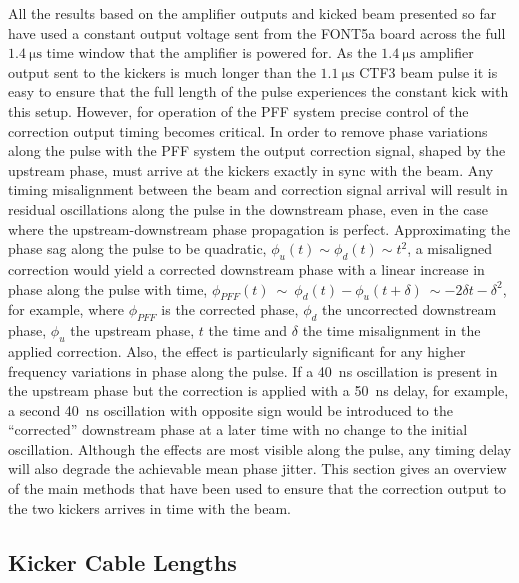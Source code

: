 
All the results based on the amplifier outputs and kicked beam presented so far have used a constant output voltage sent from the FONT5a board across the full \(1.4~\mathrm{\mu s}\) time window that the amplifier is powered for. As the \(1.4~\mathrm{\mu s}\) amplifier output sent to the kickers is much longer than the \(1.1~\mathrm{\mu s}\) CTF3 beam pulse it is easy to ensure that the full length of the pulse experiences the constant kick with this setup. However, for operation of the PFF system precise control of the correction output timing becomes critical. In order to remove phase variations along the pulse with the PFF system the output correction signal, shaped by the upstream phase, must arrive at the kickers exactly in sync with the beam. Any timing misalignment between the beam and correction signal arrival will result in residual oscillations along the pulse in the downstream phase, even in the case where the upstream-downstream phase propagation is perfect. Approximating the phase sag along the pulse to be quadratic, \(\phi_{u}(t) \sim \phi_{d}(t) \sim t^2\), a misaligned correction would yield a corrected downstream phase with a linear increase in phase along the pulse with time, \(\phi_{PFF}(t)~\sim~\phi_d(t)-\phi_u(t+\delta)~\sim -2\delta t - \delta^2\), for example, where \(\phi_{PFF}\) is the corrected phase, \(\phi_{d}\) the uncorrected downstream phase, \(\phi_{u}\) the upstream phase, \(t\) the time and \(\delta\) the time misalignment in the applied correction. Also, the effect is particularly significant for any higher frequency variations in phase along the pulse. If a 40~ns oscillation is present in the upstream phase but the correction is applied with a 50~ns delay, for example, a second 40~ns oscillation with opposite sign would be introduced to the ``corrected'' downstream phase at a later time with no change to the initial oscillation. Although the effects are most visible along the pulse, any timing delay will also degrade the achievable mean phase jitter. This section gives an overview of the main methods that have been used to ensure that the correction output to the two kickers arrives in time with the beam. 

\subsection{Kicker Cable Lengths}
\label{ss:kickerCables}

